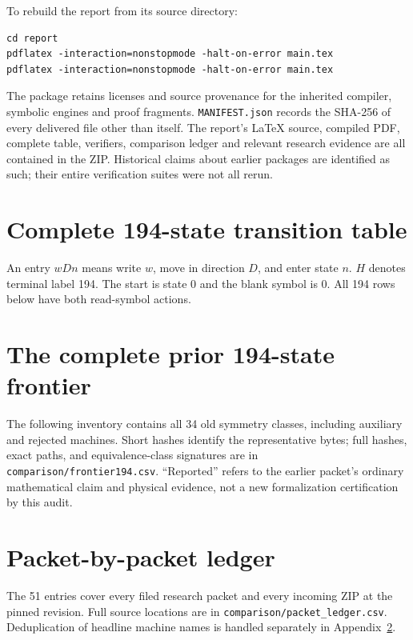 \documentclass[11pt,letterpaper]{article}
\newcommand{\file}[1]{\nolinkurl{#1}}
\begin{document}
To rebuild the report from its source directory:
\begin{verbatim}
cd report
pdflatex -interaction=nonstopmode -halt-on-error main.tex
pdflatex -interaction=nonstopmode -halt-on-error main.tex
\end{verbatim}
The package retains licenses and source provenance for the inherited compiler,
symbolic engines and proof fragments. \file{MANIFEST.json} records the SHA-256
of every delivered file other than itself. The report's LaTeX source, compiled
PDF, complete table, verifiers, comparison ledger and relevant research evidence
are all contained in the ZIP. Historical claims about earlier packages are
identified as such; their entire verification suites were not all rerun.

\appendix
\section{Complete 194-state transition table}\label{app:table}
An entry \(wDn\) means write \(w\), move in direction \(D\), and enter state
\(n\). \(H\) denotes terminal label 194. The start is state 0 and the blank
symbol is 0. All 194 rows below have both read-symbol actions.


\section{The complete prior 194-state frontier}\label{app:frontier}
The following inventory contains all 34 old symmetry classes, including
auxiliary and rejected machines. Short hashes identify the representative
bytes; full hashes, exact paths, and equivalence-class signatures are in
\file{comparison/frontier194.csv}. ``Reported'' refers to the earlier packet's
ordinary mathematical claim and physical evidence, not a new formalization
certification by this audit.


\section{Packet-by-packet ledger}\label{app:ledger}
The 51 entries cover every filed research packet and every incoming ZIP at
the pinned revision. Full source locations are in
\file{comparison/packet_ledger.csv}. Deduplication of headline machine names
is handled separately in Appendix~\ref{app:frontier}.

\end{document}
